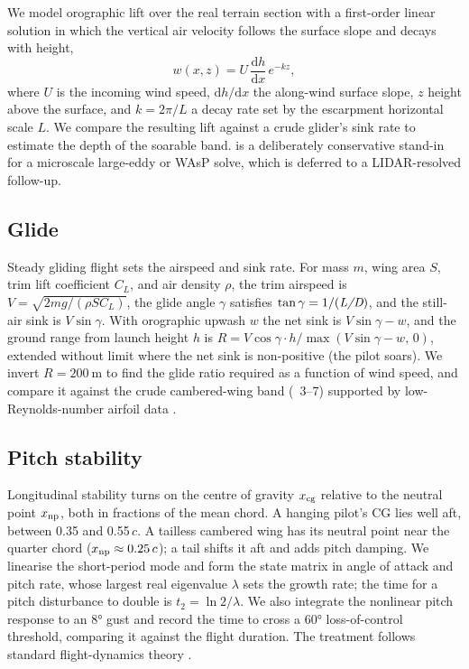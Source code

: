 We model orographic lift over the real terrain section with a first-order linear
solution in which the vertical air velocity follows the surface slope and decays
with height,
\begin{equation}
  w(x,z) = U\,\frac{\mathrm{d}h}{\mathrm{d}x}\,e^{-kz},
  \label{eq:ridge}
\end{equation}
where \(U\) is the incoming wind speed, \(\mathrm{d}h/\mathrm{d}x\) the along-wind
surface slope, \(z\) height above the surface, and \(k = 2\pi/L\) a decay rate set
by the escarpment horizontal scale \(L\).
We compare the resulting lift against a crude glider's sink rate to estimate the
depth of the soarable band.
 is a deliberately conservative stand-in for a microscale large-eddy
or WAsP solve, which is deferred to a LIDAR-resolved follow-up.

\subsection{Glide}

Steady gliding flight sets the airspeed and sink rate.
For mass \(m\), wing area \(S\), trim lift coefficient \(C_L\), and air density
\(\rho\), the trim airspeed is \(V = \sqrt{2mg/(\rho S C_L)}\), the glide angle
\(\gamma\) satisfies \(\tan\gamma = 1/(\textit{L/D})\), and the still-air sink is
\(V\sin\gamma\).
With orographic upwash \(w\) the net sink is \(V\sin\gamma - w\), and the ground
range from launch height \(h\) is \(R = V\cos\gamma \cdot h/\max(V\sin\gamma-w,\,0)\),
extended without limit where the net sink is non-positive (the pilot soars).
We invert \(R = \SI{200}{\meter}\) to find the glide ratio required as a function of
wind speed, and compare it against the crude cambered-wing band (\LD\
\numrange{3}{7}) supported by low-Reynolds-number airfoil data
\autocite{lissaman1983lowre,hoerner1985lift,drela2014flight,faa_glider}.

\subsection{Pitch stability}

Longitudinal stability turns on the centre of gravity \(x_\mathrm{cg}\) relative to the
neutral point \(x_\mathrm{np}\), both in fractions of the mean chord.
A hanging pilot's CG lies well aft, between \num{0.35} and \num{0.55}\,\(c\).
A tailless cambered wing has its neutral point near the quarter chord
(\(x_\mathrm{np} \approx 0.25\,c\)); a tail shifts it aft and adds pitch damping.
We linearise the short-period mode and form the state matrix in angle of attack and
pitch rate, whose largest real eigenvalue \(\lambda\) sets the growth rate; the time
for a pitch disturbance to double is \(t_2 = \ln 2/\lambda\).
We also integrate the nonlinear pitch response to an \ang{8} gust and record the
time to cross a \ang{60} loss-of-control threshold, comparing it against the flight
duration.
The treatment follows standard flight-dynamics theory \autocite{drela2014flight}.

